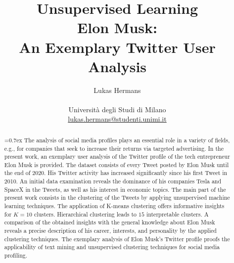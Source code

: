 \title{\large Unsupervised Learning \\ \LARGE
 Elon Musk:\\An Exemplary Twitter User Analysis}
\author{Lukas Hermans\\ \\
{Università degli Studi di Milano} \\
\href{mailto:lukas.hermans@studenti.unimi.it}
{lukas.hermans@studenti.unimi.it}}

\maketitle

\begin{abstract} 
\noindent
{}\font=0.7ex%
The analysis of social media profiles plays an essential role in a variety of fields, e.g., for companies that seek to increase their returns via targeted advertising. In the present work, an exemplary user analysis of the Twitter profile of the tech entrepreneur Elon Musk is provided. The dataset consists of every Tweet posted by Elon Musk until the end of 2020. His Twitter activity has increased significantly since his first Tweet in 2010. An initial data examination reveals the dominance of his companies Tesla and SpaceX in the Tweets, as well as his interest in economic topics. The main part of the present work consists in the clustering of the Tweets by applying unsupervised machine learning techniques. The application of K-means clustering offers informative insights for $K=10$ clusters. Hierarchical clustering leads to $15$ interpretable clusters. A comparison of the obtained insights with the general knowledge about Elon Musk reveals a precise description of his career, interests,  and personality by the applied clustering techniques. The exemplary analysis of Elon Musk's Twitter profile proofs the applicability of text mining and unsupervised clustering techniques for social media profiling. 
\end{abstract}
